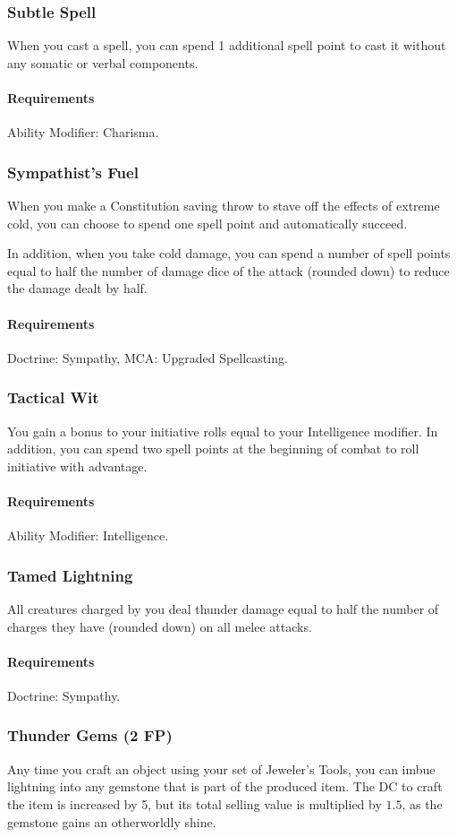 \subsubsection{Subtle Spell} \label{feat::subtlespell}
    When you cast a spell, you can spend 1 additional spell point to cast it without any somatic or verbal components.
    \paragraph{Requirements} Ability Modifier: Charisma.
\subsubsection{Sympathist's Fuel} \label{feat::sympathistsfuel}
    When you make a Constitution saving throw to stave off the effects of extreme cold, you can choose to spend one spell point and automatically succeed.

    In addition, when you take cold damage, you can spend a number of spell points equal to half the number of damage dice of the attack (rounded down) to reduce the damage dealt by half.
    \paragraph{Requirements} Doctrine: Sympathy, MCA: Upgraded Spellcasting.
\subsubsection{Tactical Wit} \label{feat::tacticalwit}
    You gain a bonus to your initiative rolls equal to your Intelligence modifier.
    In addition, you can spend two spell points at the beginning of combat to roll initiative with advantage.
    \paragraph{Requirements} Ability Modifier: Intelligence.
\subsubsection{Tamed Lightning} \label{feat::tamedlightning}
    All creatures charged by you deal thunder damage equal to half the number of charges they have (rounded down) on all melee attacks.
    \paragraph{Requirements} Doctrine: Sympathy.
\subsubsection{Thunder Gems (2 FP)} \label{feat::thundergems}
    Any time you craft an object using your set of Jeweler's Tools, you can imbue lightning into any gemstone that is part of the produced item.
    The DC to craft the item is increased by 5, but its total selling value is multiplied by $1.5$, as the gemstone gains an otherworldly shine.

